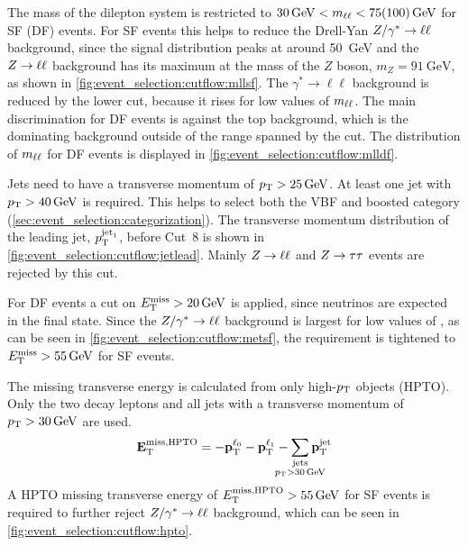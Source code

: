 \begin{description}[style=nextline,leftmargin=1cm]
        The mass of the dilepton system is restricted to $\SI{30}{\GeV} < \mll < \SI{75\,(100)}{\GeV}$ for SF (DF) events.
        For SF events this helps to reduce the Drell-Yan $Z / \gamma^* \to \ell \ell$ background, since the signal distribution peaks at around \SI{50}{\GeV}
        and the $Z \to \ell \ell$ background has its maximum at the mass of the $Z$ boson, $m_Z = \SI{91}{\GeV}$, as shown in \cref{fig:event_selection:cutflow:mllsf}.
        The $\gamma^* \to \ell\ell$ background is reduced by the lower cut, because it rises for low values of $m_{\ell\ell}$.
        The main discrimination for DF events is against the top background, which is the dominating background outside of the range spanned by the cut.
        The distribution of $m_{\ell\ell}$ for DF events is displayed in \cref{fig:event_selection:cutflow:mlldf}.
    \item[\ \,(8) Jet momentum]
        Jets need to have a transverse momentum of $\pt > \SI{25}{\GeV}$. At least one jet with $\pt > \SI{40}{\GeV}$ is
        required.
        This helps to select both the VBF and boosted category (\cref{sec:event_selection:categorization}).
        The transverse momentum distribution of the leading jet, $p_\text{T}^{\text{jet}_1}$, before Cut~8 is shown in \cref{fig:event_selection:cutflow:jetlead}.
        Mainly $Z \to \ell \ell$ and $Z \to \tau \tau$ events are rejected by this cut.
    \item[\ \,(9) Missing transverse energy]
        For DF events a cut on $\etmiss > \SI{20}{\GeV}$ is applied, since neutrinos are expected in the final state.
        Since the $Z / \gamma^* \to \ell \ell$ background is largest for low values of \etmiss{}, as can be seen in \cref{fig:event_selection:cutflow:metsf},
        the requirement is tightened to $\etmiss > \SI{55}{\GeV}$ for SF events.
    \item[(10) Missing transverse energy (HPTO)]
        The missing transverse energy is calculated from only high-$p_\text{T}$ objects (HPTO). Only the two decay leptons and
        all jets with a transverse momentum of $\pt > \SI{30}{\GeV}$ are used.
        \begin{equation}
            \label{eq:met:hpto}
            \etmissvecobj{\text{HPTO}} = - \ptvec^{\ell_0} - \ptvec^{\ell_1} - \sum_{\mathclap{\substack{\text{jets} \\ \pt > \SI{30}{\GeV}}}} \ptvec^\text{jet}
        \end{equation}
        A HPTO missing transverse energy of $\etmisshpto > \SI{55}{\GeV}$ for SF events is required to further reject
        $Z / \gamma^* \to \ell \ell$ background, which can be seen in \cref{fig:event_selection:cutflow:hpto}.

\end{description}
